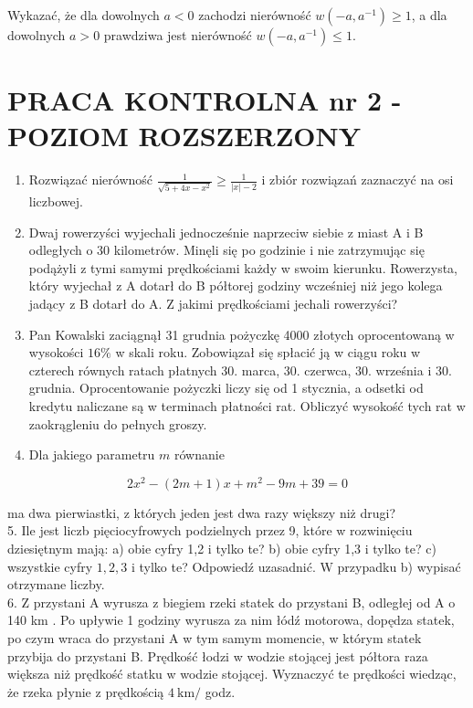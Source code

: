 \documentclass[10pt]{article}
\begin{document}
Wykazać, że dla dowolnych $a<0$ zachodzi nierówność $w\left(-a, a^{-1}\right) \geqslant 1$, a dla dowolnych $a>0$ prawdziwa jest nierówność $w\left(-a, a^{-1}\right) \leqslant 1$.

\section*{PRACA KONTROLNA nr 2 - POZIOM ROZSZERZONY}
\begin{enumerate}
  \item Rozwiązać nierówność $\frac{1}{\sqrt{5+4 x-x^{2}}} \geqslant \frac{1}{|x|-2}$ i zbiór rozwiązań zaznaczyć na osi liczbowej.
  \item Dwaj rowerzyści wyjechali jednocześnie naprzeciw siebie z miast A i B odległych o 30 kilometrów. Minęli się po godzinie i nie zatrzymując się podążyli z tymi samymi prędkościami każdy w swoim kierunku. Rowerzysta, który wyjechał z A dotarł do B półtorej godziny wcześniej niż jego kolega jadący z B dotarł do A. Z jakimi prędkościami jechali rowerzyści?
  \item Pan Kowalski zaciągnął 31 grudnia pożyczkę 4000 złotych oprocentowaną w wysokości $16 \%$ w skali roku. Zobowiązał się spłacić ją w ciągu roku w czterech równych ratach płatnych 30. marca, 30. czerwca, 30. września i 30. grudnia. Oprocentowanie pożyczki liczy się od 1 stycznia, a odsetki od kredytu naliczane są w terminach płatności rat. Obliczyć wysokość tych rat w zaokrągleniu do pełnych groszy.
  \item Dla jakiego parametru $m$ równanie
\end{enumerate}

$$
2 x^{2}-(2 m+1) x+m^{2}-9 m+39=0
$$

ma dwa pierwiastki, z których jeden jest dwa razy większy niż drugi?\\
5. Ile jest liczb pięciocyfrowych podzielnych przez 9, które w rozwinięciu dziesiętnym mają: a) obie cyfry 1,2 i tylko te? b) obie cyfry 1,3 i tylko te? c) wszystkie cyfry $1,2,3$ i tylko te? Odpowiedź uzasadnić. W przypadku b) wypisać otrzymane liczby.\\
6. Z przystani A wyrusza z biegiem rzeki statek do przystani B, odległej od A o 140 km . Po upływie 1 godziny wyrusza za nim łódź motorowa, dopędza statek, po czym wraca do przystani A w tym samym momencie, w którym statek przybija do przystani B. Prędkość łodzi w wodzie stojącej jest półtora raza większa niż prędkość statku w wodzie stojącej. Wyznaczyć te prędkości wiedząc, że rzeka płynie z prędkością $4 \mathrm{~km} /$ godz.
\end{document}

